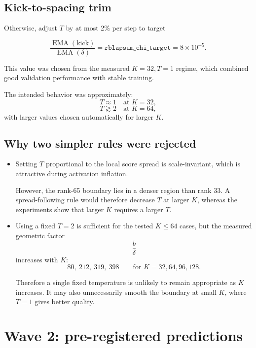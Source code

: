 \documentclass[11pt,a4paper]{article}
\newcommand{\code}[1]{\texttt{#1}}
\newcommand{\EMA}{\operatorname{EMA}}
\begin{document}
\subsection*{Kick-to-spacing trim}

Otherwise, adjust \(T\) by at most 2\% per step to target

\[
\frac{
\EMA(\text{kick})
}{
\EMA(\delta)
}
=
\code{rblapsum\_chi\_target}
=
8\times10^{-5}.
\]

This value was chosen from the measured \(K=32,T=1\) regime, which combined
good validation performance with stable training.

The intended behavior was approximately:
\[
T\approx1
\quad\text{at }K=32,
\]
\[
T\gtrsim2
\quad\text{at }K=64,
\]
with larger values chosen automatically for larger \(K\).


\subsection*{Why two simpler rules were rejected}

\begin{itemize}[leftmargin=1.4em]

\item
Setting \(T\) proportional to the local score spread is scale-invariant, which
is attractive during activation inflation.

However, the rank-65 boundary lies in a denser region than rank 33.
A spread-following rule would therefore decrease \(T\) at larger \(K\), whereas
the experiments show that larger \(K\) requires a larger \(T\).

\item
Using a fixed \(T=2\) is sufficient for the tested \(K\le64\) cases, but the
measured geometric factor
\[
\frac{b}{\delta}
\]
increases with \(K\):
\[
80,\ 212,\ 319,\ 398
\qquad
\text{for }
K=32,64,96,128.
\]

Therefore a single fixed temperature is unlikely to remain appropriate as
\(K\) increases.
It may also unnecessarily smooth the boundary at small \(K\), where \(T=1\)
gives better quality.

\end{itemize}


\section{Wave 2: pre-registered predictions}
\end{document}
